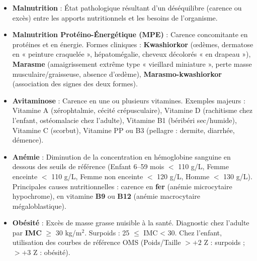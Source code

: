 \documentclass[11pt]{article}
\begin{document}
\begin{definition}
\begin{itemize}
  \item \textbf{Malnutrition} : État pathologique résultant d'un déséquilibre (carence ou excès) entre les apports nutritionnels et les besoins de l'organisme.
  \item \textbf{Malnutrition Protéino-Énergétique (MPE)} : Carence concomitante en protéines et en énergie. Formes cliniques : \textbf{Kwashiorkor} (œdèmes, dermatose en « peinture craquelée », hépatomégalie, cheveux décolorés « en drapeau »), \textbf{Marasme} (amaigrissement extrême type « vieillard miniature », perte masse musculaire/graisseuse, absence d'œdème), \textbf{Marasmo-kwashiorkor} (association des signes des deux formes).
  \item \textbf{Avitaminose} : Carence en une ou plusieurs vitamines. Exemples majeurs : Vitamine A (xérophtalmie, cécité crépusculaire), Vitamine D (rachitisme chez l'enfant, ostéomalacie chez l'adulte), Vitamine B1 (béribéri sec/humide), Vitamine C (scorbut), Vitamine PP ou B3 (pellagre : dermite, diarrhée, démence).
  \item \textbf{Anémie} : Diminution de la concentration en hémoglobine sanguine en dessous des seuils de référence (Enfant 6--59 mois $<$ 110 g/L, Femme enceinte $<$ 110 g/L, Femme non enceinte $<$ 120 g/L, Homme $<$ 130 g/L). Principales causes nutritionnelles : carence en \textbf{fer} (anémie microcytaire hypochrome), en vitamine \textbf{B9} ou \textbf{B12} (anémie macrocytaire mégaloblastique).
  \item \textbf{Obésité} : Excès de masse grasse nuisible à la santé. Diagnostic chez l'adulte par \textbf{IMC} $\ge$ 30 kg/m$^2$. Surpoids : 25 $\le$ IMC < 30. Chez l'enfant, utilisation des courbes de référence OMS (Poids/Taille $>+2$ Z : surpoids ; $>+3$ Z : obésité).
\end{itemize}
\end{definition}
\end{document}
